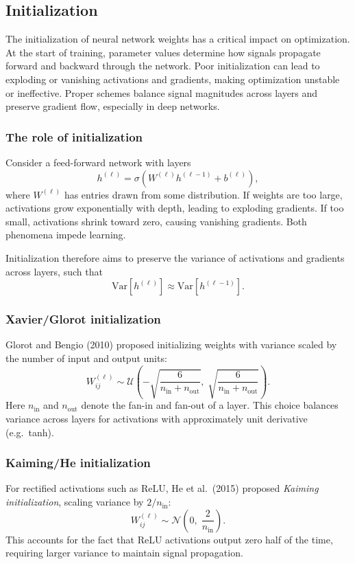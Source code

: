 \subsection{Initialization}
\label{sec:initialization}

The initialization of neural network weights has a critical impact on 
optimization. At the start of training, parameter values determine how 
signals propagate forward and backward through the network. Poor initialization 
can lead to exploding or vanishing activations and gradients, making 
optimization unstable or ineffective. Proper schemes balance signal magnitudes 
across layers and preserve gradient flow, especially in deep networks.  

\subsubsection{The role of initialization}
Consider a feed-forward network with layers
\[
  h^{(\ell)} = \sigma\!\left(W^{(\ell)} h^{(\ell-1)} + b^{(\ell)}\right),
\]
where $W^{(\ell)}$ has entries drawn from some distribution.  
If weights are too large, activations grow exponentially with depth, 
leading to exploding gradients. If too small, activations shrink toward zero, 
causing vanishing gradients. Both phenomena impede learning.  

Initialization therefore aims to preserve the variance of activations 
and gradients across layers, such that
\[
  \mathrm{Var}[h^{(\ell)}] \approx \mathrm{Var}[h^{(\ell-1)}].
\]

\subsubsection{Xavier/Glorot initialization}
Glorot and Bengio (2010) proposed initializing weights with variance scaled 
by the number of input and output units:
\begin{equation}
  W_{ij}^{(\ell)} \sim \mathcal{U}\!\left(-\sqrt{\frac{6}{n_\text{in}+n_\text{out}}}, \;
  \sqrt{\frac{6}{n_\text{in}+n_\text{out}}}\right).
\end{equation}
Here $n_\text{in}$ and $n_\text{out}$ denote the fan-in and fan-out of a layer.  
This choice balances variance across layers for activations with 
approximately unit derivative (e.g.\ tanh).  

\subsubsection{Kaiming/He initialization}
For rectified activations such as ReLU, He et al.\ (2015) proposed 
\emph{Kaiming initialization}, scaling variance by $2/n_\text{in}$:
\begin{equation}
  W_{ij}^{(\ell)} \sim \mathcal{N}\!\left(0, \; \frac{2}{n_\text{in}}\right).
\end{equation}
This accounts for the fact that ReLU activations output zero half of the time, 
requiring larger variance to maintain signal propagation.  

